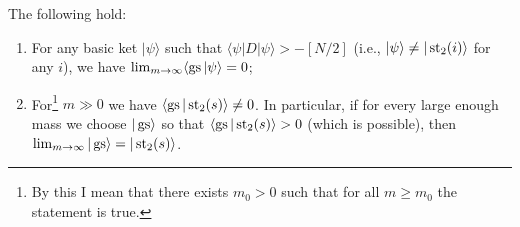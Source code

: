 \begin{lemma} \label{l:gs_conv_pos}
The following hold:
\begin{enumerate}
\item For any basic ket $|\psi\rangle$ such that $\langle \psi |D|\psi\rangle > -[N/2]$ (i.e., $|\psi\rangle \neq |\operatorname{st}_2(i)\rangle$ for any $i$), we have $\lim_{m \rightarrow \infty} \langle \operatorname{gs} | \psi \rangle = 0$;
\item For\footnote{By this I mean that there exists $m_0 > 0$ such that for all $m \geq m_0$ the statement is true.} $m \gg 0$ we have $\left\langle \operatorname{gs} | \operatorname{st}_2(s) \right\rangle \neq 0$. In particular, if for every large enough mass we choose $|\operatorname{gs}\rangle$ so that $\langle \operatorname{gs} | \operatorname{st}_2(s) \rangle > 0$ (which is possible), then $\lim_{m \rightarrow \infty} |\operatorname{gs}\rangle = |\operatorname{st}_2(s)\rangle$.
\end{enumerate}
\end{lemma}

